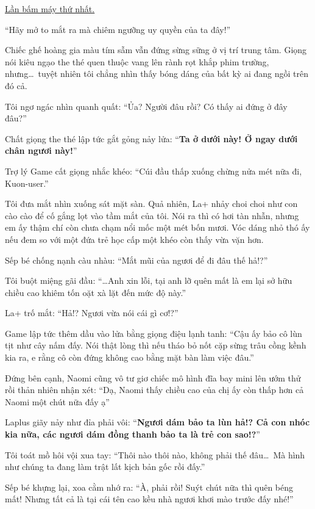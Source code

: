 \documentclass[../main.tex]{subfiles}
\begin{document}
\begin{center}
    \uline{Lần bấm máy thứ nhất.}
\end{center}

``Hãy mở to mắt ra mà chiêm ngưỡng uy quyền của ta đây!''

Chiếc ghế hoàng gia màu tím sẫm vẫn đứng sừng sững ở vị trí trung tâm. Giọng nói kiêu ngạo the thé quen thuộc vang lên rành rọt khắp phim trường, nhưng\dots\ tuyệt nhiên tôi chẳng nhìn thấy bóng dáng của bất kỳ ai đang ngồi trên đó cả.

Tôi ngơ ngác nhìn quanh quất: ``Ủa? Người đâu rồi? Có thấy ai đứng ở đây đâu?''

Chất giọng the thé lập tức gắt gỏng nảy lửa: ``\textbf{Ta ở dưới này! Ở ngay dưới chân ngươi này!}''

Trợ lý Game cất giọng nhắc khéo: ``Cúi đầu thấp xuống chừng nửa mét nữa đi, Kuon-user.''

Tôi đưa mắt nhìn xuống sát mặt sàn. Quả nhiên, La+ nhảy choi choi như con cào cào để cố gắng lọt vào tầm mắt của tôi. Nói ra thì có hơi tàn nhẫn, nhưng em ấy thậm chí còn chưa chạm nổi mốc một mét bốn mươi. Vóc dáng nhỏ thó ấy nếu đem so với một đứa trẻ học cấp một khéo còn thấy vừa vặn hơn.

Sếp bé chống nạnh càu nhàu: ``Mắt mũi của ngươi để đi đâu thế hả!?''

Tôi buột miệng gãi đầu: ``\dots Anh xin lỗi, tại anh lỡ quên mất là em lại sở hữu chiều cao khiêm tốn oặt xà lặt đến mức độ này.''

La+ trố mắt: ``Hả!? Ngươi vừa nói cái gì cơ!?''

Game lập tức thêm dầu vào lửa bằng giọng điệu lạnh tanh: ``Cậu ấy bảo cô lùn tịt như cây nấm đấy. Nói thật lòng thì nếu tháo bỏ nốt cặp sừng trâu cồng kềnh kia ra, e rằng cô còn đứng không cao bằng mặt bàn làm việc đâu.''

Đứng bên cạnh, Naomi cũng vô tư giơ chiếc mô hình đĩa bay mini lên ướm thử rồi thản nhiên nhận xét: ``Dạ, Naomi thấy chiều cao của chị ấy còn thấp hơn cả Naomi một chút nữa đấy ạ''

Laplus giãy nảy như đỉa phải vôi: ``\textbf{Ngươi dám bảo ta lùn hả!? Cả con nhóc kia nữa, các ngươi dám đồng thanh bảo ta là trẻ con sao!?}''

Tôi toát mồ hôi vội xua tay: ``Thôi nào thôi nào, không phải thế đâu\dots\ Mà hình như chúng ta đang làm trật lất kịch bản gốc rồi đấy.''

Sếp bé khựng lại, xoa cằm nhớ ra: ``À, phải rồi! Suýt chút nữa thì quên béng mất! Nhưng tất cả là tại cái tên cao kều nhà ngươi khơi mào trước đấy nhé!''
\end{document}
